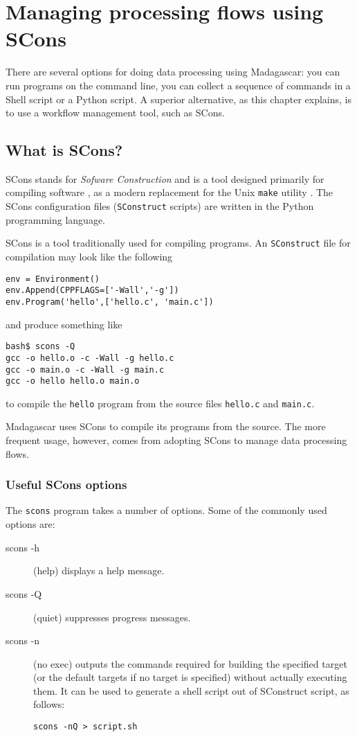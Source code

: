 \chapter{Managing processing flows using SCons}

There are several options for doing data processing using Madagascar:
you can run programs on the command line, you can collect a sequence
of commands in a Shell script or a Python script. A superior
alternative, as this chapter explains, is to use a workflow management
tool, such as SCons.

\section{What is SCons?}

SCons stands for \emph{Sofware Construction} and is a tool designed
primarily for compiling software \cite[]{scons}, as a modern
replacement for the Unix \texttt{make} utility \cite[]{make}. The
SCons configuration files (\texttt{SConstruct} scripts) are written in
the Python programming language.

SCons is a tool traditionally used for compiling programs. An \texttt{SConstruct} file for compilation may look like the following
\lstset{language=python,numbers=left,numberstyle=\tiny,showstringspaces=false}
\begin{lstlisting}
env = Environment()
env.Append(CPPFLAGS=['-Wall','-g'])
env.Program('hello',['hello.c', 'main.c'])
\end{lstlisting}
and produce something like
\begin{verbatim}
bash$ scons -Q
gcc -o hello.o -c -Wall -g hello.c
gcc -o main.o -c -Wall -g main.c
gcc -o hello hello.o main.o
\end{verbatim}
to compile the \texttt{hello} program from the source files \texttt{hello.c} and \texttt{main.c}.

Madagascar uses SCons to compile its programs from the source. The
more frequent usage, however, comes from adopting SCons to manage data
processing flows.

\subsection{Useful SCons options}

The \texttt{scons} program takes a number of options. Some of the commonly used options are:
\begin{description}
  \item[scons -h] (help) displays a help message.
  \item[scons -Q] (quiet) suppresses progress messages.
  \item[scons -n] (no exec) outputs the commands required for building the specified target (or the default targets if no target is specified) without actually executing them. It can be used to generate a shell script out of SConstruct script, as follows:
\begin{verbatim}
scons -nQ > script.sh
\end{verbatim}
\end{description}

